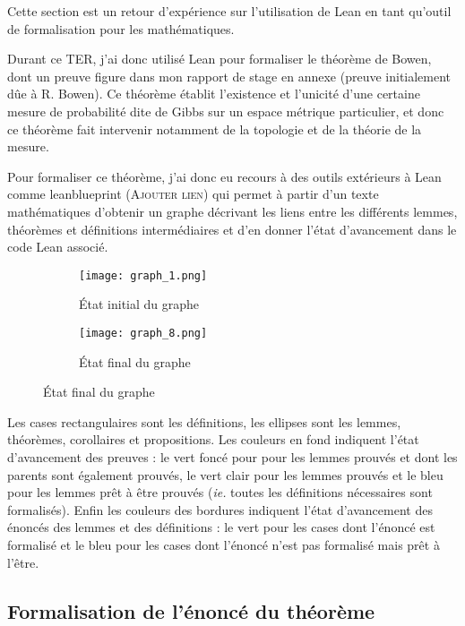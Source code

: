 \documentclass[../../rapport.tex]{subfiles}
\begin{document}
  Cette section est un retour d'expérience sur l'utilisation de Lean en tant qu'outil de formalisation pour les
  mathématiques.

  Durant ce TER, j'ai donc utilisé Lean pour formaliser le théorème de Bowen, dont un preuve figure dans mon rapport de stage
  en annexe (preuve initialement dûe à R. Bowen).
  Ce théorème établit l'existence et l'unicité d'une certaine mesure de probabilité dite de Gibbs sur un espace métrique particulier,
  et donc ce théorème fait intervenir notamment de la topologie et de la théorie de la mesure.

  Pour formaliser ce théorème, j'ai donc eu recours à des outils extérieurs à Lean comme
  leanblueprint (\textsc{Ajouter lien})
  qui permet à partir d'un texte mathématiques d'obtenir un graphe décrivant les liens entre les différents lemmes,
  théorèmes et définitions intermédiaires et d'en donner l'état d'avancement dans le code Lean associé.

  \begin{figure}[h]
    \centering
    \begin{subfigure}{.55\textwidth}
      \centering
      \texttt{[image: graph\_1.png]}
      \caption{État initial du graphe}
    \end{subfigure}
    \begin{subfigure}{.43\textwidth}
      \centering
      \texttt{[image: graph\_8.png]}
      \caption{État final du graphe}
    \end{subfigure}
  \end{figure}

  \begin{spacing}{0.8}
  {\scriptsize
  Les cases rectangulaires sont les définitions, les ellipses sont les lemmes, théorèmes, corollaires et propositions.
  Les couleurs en fond indiquent l'état d'avancement des preuves :
  le vert foncé pour pour les lemmes prouvés et dont les parents sont également prouvés,
  le vert clair pour les lemmes prouvés
  et le bleu pour les lemmes prêt à être prouvés (\textit{ie.} toutes les définitions nécessaires sont formalisés).
  Enfin les couleurs des bordures indiquent l'état d'avancement des énoncés des lemmes et des définitions :
  le vert pour les cases dont l'énoncé est formalisé
  et le bleu pour les cases dont l'énoncé n'est pas formalisé mais prêt à l'être.}
  \end{spacing}

  \subsection{Formalisation de l'énoncé du théorème}
\end{document}
